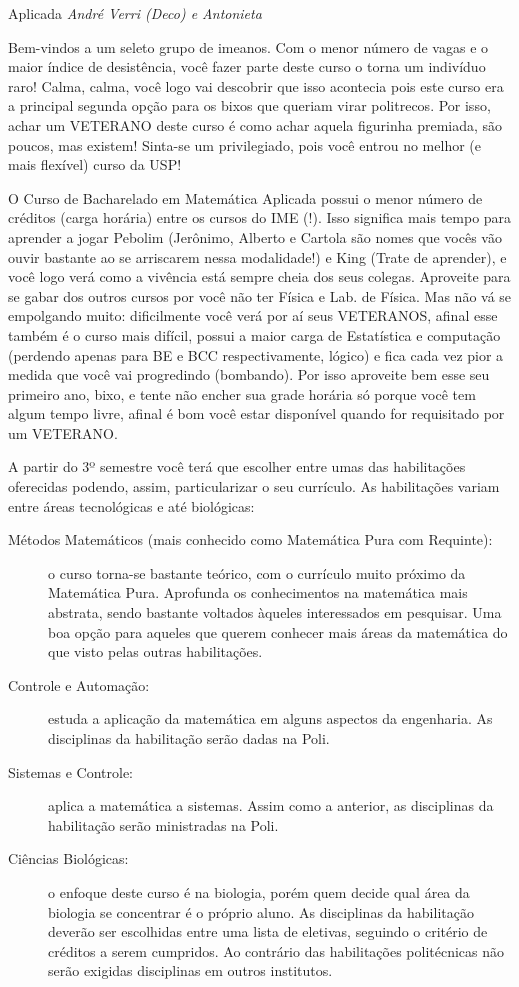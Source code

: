 \begin{subsecao}{Aplicada}
{\em André Verri (Deco) e Antonieta}

Bem-vindos a um seleto grupo de imeanos. Com o menor número de vagas e o
maior índice de desistência, você fazer parte deste curso o torna um indivíduo
raro! Calma, calma, você logo vai descobrir que isso acontecia pois este curso
era a principal segunda opção para os bixos que queriam virar politrecos. Por
isso, achar um VETERANO deste curso é como achar aquela figurinha premiada, são
poucos, mas existem! Sinta-se um privilegiado, pois você entrou no melhor (e
mais flexível) curso da USP!

O Curso de Bacharelado em Matemática Aplicada possui o menor número de
créditos (carga horária) entre os cursos do IME (!). Isso significa mais tempo
para aprender a jogar Pebolim (Jerônimo, Alberto e Cartola são nomes que vocês
vão ouvir bastante ao se arriscarem nessa modalidade!) e King (Trate de
aprender), e você logo verá como a vivência está sempre cheia dos seus colegas.
Aproveite para se gabar dos outros cursos por você não ter Física e Lab. de
Física. Mas não vá se empolgando muito: dificilmente você verá por aí seus
VETERANOS, afinal esse também é o curso mais difícil, possui a maior carga de
Estatística e computação (perdendo apenas para BE e BCC respectivamente,
lógico) e fica cada vez pior a medida que você vai progredindo (bombando). Por
isso aproveite bem esse seu primeiro ano, bixo, e tente não encher sua grade
horária só porque você tem algum tempo livre, afinal é bom você estar
disponível quando for requisitado por um VETERANO.

A partir do 3º semestre você terá que escolher entre umas das habilitações
oferecidas podendo, assim, particularizar o seu currículo. As habilitações
variam entre áreas tecnológicas e até biológicas:
\begin{description}
\item [Métodos Matemáticos (mais conhecido como Matemática Pura com Requinte):]
o curso torna-se bastante teórico, com o currículo muito próximo da Matemática
Pura. Aprofunda os conhecimentos na matemática mais abstrata, sendo bastante
voltados àqueles interessados em pesquisar. Uma boa opção para aqueles que
querem conhecer mais áreas da matemática do que visto pelas outras habilitações.
\item [Controle e Automação:] estuda a aplicação da matemática em alguns
aspectos da engenharia. As disciplinas da habilitação serão dadas na Poli.
\item  [Sistemas e Controle:] aplica a matemática a sistemas. Assim como a
anterior, as disciplinas da habilitação serão ministradas na Poli.
\item  [Ciências Biológicas:] o enfoque deste curso é na biologia, porém quem
decide qual área da biologia se concentrar é o próprio aluno. As disciplinas da
habilitação deverão ser escolhidas entre uma lista de eletivas, seguindo o
critério de créditos a serem cumpridos. Ao contrário das habilitações
politécnicas não serão exigidas disciplinas em outros institutos.
\end{description}


\end{subsecao}

